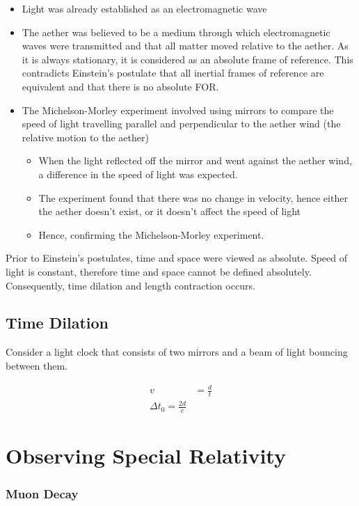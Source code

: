 		\begin{itemize}
			\item Light was already established as an electromagnetic wave
			\item The aether was believed to be a medium through which electromagnetic waves were transmitted and that all matter moved relative to the aether. As it is always stationary, it is considered as an absolute frame of reference. This contradicts Einstein's postulate that all inertial frames of reference are equivalent and that there is no absolute FOR.
			\item The Michelson-Morley experiment involved using mirrors to compare the speed of light travelling parallel and perpendicular to the aether wind (the relative motion to the aether)
				\begin{itemize}
					\item When the light reflected off the mirror and went against the aether wind, a difference in the speed of light was expected.
					\item The experiment found that there was no change in velocity, hence either the aether doesn't exist, or it doesn't affect the speed of light
					\item Hence, confirming the Michelson-Morley experiment.
				\end{itemize}
		\end{itemize}

		Prior to Einstein's postulates, time and space were viewed as absolute. Speed of light is constant, therefore time and space cannot be defined absolutely. Consequently, time dilation and length contraction occurs.

	\subsection{Time Dilation}
	
		Consider a light clock that consists of two mirrors and a beam of light bouncing between them.

		\begin{align*}
			v &= \frac{d}{t} \\
			\Delta t_0 = \frac{2d}{c}
		\end{align*}
	
\section{Observing Special Relativity}

	\subsubsection{Muon Decay}
	
